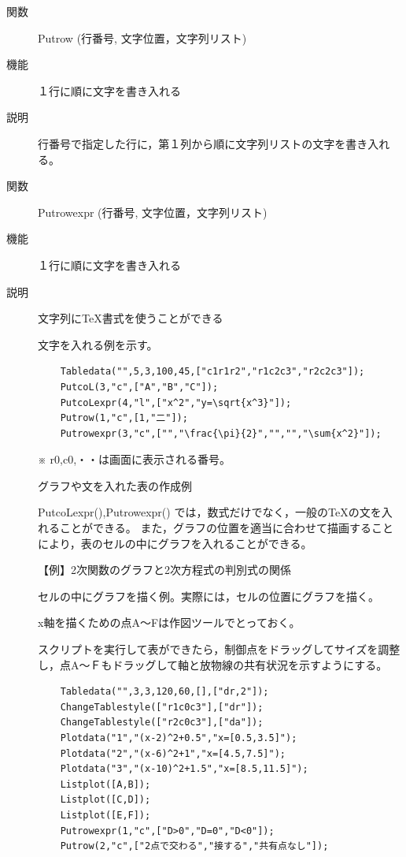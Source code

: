 \documentclass[papersize,a4paper,12pt,uplatex]{jsarticle}
\begin{document}
\begin{description}
\vspace{\baselineskip}
\hypertarget{putrow}{}
\item[関数]  Putrow (行番号, 文字位置，文字列リスト)
\item[機能]  １行に順に文字を書き入れる
\item[説明]  行番号で指定した行に，第１列から順に文字列リストの文字を書き入れる。


\vspace{\baselineskip}
\hypertarget{putrowexpr}{}
\item[関数]  Putrowexpr (行番号, 文字位置，文字列リスト)
\item[機能]  １行に順に文字を書き入れる
\item[説明]  文字列に\TeX 書式を使うことができる

文字を入れる例を示す。
\begin{verbatim}
    Tabledata("",5,3,100,45,["c1r1r2","r1c2c3","r2c2c3"]);
    PutcoL(3,"c",["A","B","C"]);
    PutcoLexpr(4,"l",["x^2","y=\sqrt{x^3}"]);
    Putrow(1,"c",[1,"二"]);
    Putrowexpr(3,"c",["","\frac{\pi}{2}","","","\sum{x^2}"]);
\end{verbatim}
 \vspace{\baselineskip}
          \begin{center}  \end{center}

  ※ r0,c0,・・は画面に表示される番号。

グラフや文を入れた表の作成例

  PutcoLexpr(),Putrowexpr() では，数式だけでなく，一般の\TeX の文を入れることができる。
  また，グラフの位置を適当に合わせて描画することにより，表のセルの中にグラフを入れることができる。

\vspace{\baselineskip}
  【例】2次関数のグラフと2次方程式の判別式の関係
  
セルの中にグラフを描く例。実際には，セルの位置にグラフを描く。

x軸を描くための点A〜Fは作図ツールでとっておく。

スクリプトを実行して表ができたら，制御点をドラッグしてサイズを調整し，点A〜Ｆもドラッグして軸と放物線の共有状況を示すようにする。

\vspace{\baselineskip}
\begin{verbatim}
    Tabledata("",3,3,120,60,[],["dr,2"]);
    ChangeTablestyle(["r1c0c3"],["dr"]);
    ChangeTablestyle(["r2c0c3"],["da"]);
    Plotdata("1","(x-2)^2+0.5","x=[0.5,3.5]");
    Plotdata("2","(x-6)^2+1","x=[4.5,7.5]");
    Plotdata("3","(x-10)^2+1.5","x=[8.5,11.5]");
    Listplot([A,B]);
    Listplot([C,D]);
    Listplot([E,F]);
    Putrowexpr(1,"c",["D>0","D=0","D<0"]);
    Putrow(2,"c",["2点で交わる","接する","共有点なし"]);
\end{verbatim}


\end{description}
\end{document}
